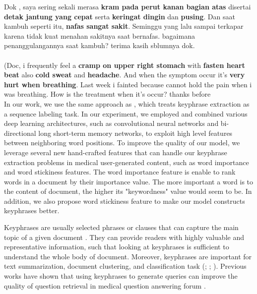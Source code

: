 	Dok , saya sering sekali merasa \textbf{kram pada perut kanan bagian atas} disertai \textbf{detak jantung yang cepat} serta \textbf{keringat dingin} dan \textbf{pusing}. Dan saat kambuh seperti itu, \textbf{nafas sangat sakit}. Seminggu yang lalu sampai terkapar karena tidak kuat menahan sakitnya saat bernafas. bagaimana penanggulangannya saat kambuh? terima kasih sblumnya dok. \\\\
	(Doc, i frequently feel a \textbf{cramp on upper right stomach} with \textbf{fasten heart beat} also \textbf{cold sweat} and \textbf{headache}. And when the symptom occur it's \textbf{very hurt when breathing}. Last week i fainted because cannot hold the pain when i was breathing. How is the treatment when it's occur? thanks before \\

In our work, we use the same approach as \cite{cao2010automatically}, which treats keyphrase extraction as a sequence labeling task. In our experiment, we employed and combined various deep learning architectures, such as convolutional neural networks and bi-directional long short-term memory networks, to exploit high level features between neighboring word positions. To improve the quality of our model, we leverage several new hand-crafted features that can handle our keyphrase extraction problems in medical user-generated content, such as word importance and word stickiness features. The word importance feature is enable to rank words in a document by their importance value. The more important a word is to the content of document, the higher its "keywordness" value would seem to be. In addition, we also propose word stickiness feature to make our model constructs keyphrases better. 

\iffalse
Keyphrases are usually selected phrases or clauses that can capture the main topic of a given document \cite{turney2000learning}. They can provide readers with highly valuable and representative information, such that looking at keyphrases is sufficient to understand the whole body of document. Moreover, keyphrases are important for text summarization, document clustering, and classification task (\cite{classDocumentEkp1}; \cite{qaEkp}; \cite{gong2009improving}). Previous works have shown that using keyphrases to generate queries can improve the quality of question retrieval in medical question answering forum \cite{cao2010automatically}.


